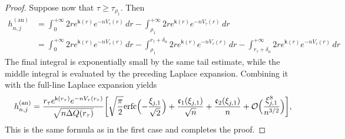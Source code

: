 \documentclass[a4paper]{article}
\numberwithin{equation}{section}
\begin{document}
\begin{proof}
Suppose now that $\tau\geq\tau_{\rho_1}$. Then
\begin{align*}
h_{n,j}^{(\mathrm{an})}
&=
\int_0^{+\infty}
2re^{\mathsf{k}(r)}e^{-nV_{\tau}(r)}\,dr
-\int_{\rho_1}^{+\infty}
2re^{\mathsf{k}(r)}e^{-nV_{\tau}(r)}\,dr
\\
&=
\int_0^{+\infty}
2re^{\mathsf{k}(r)}e^{-nV_{\tau}(r)}\,dr
-\int_{\rho_1}^{r_{\tau}+\delta_n}
2re^{\mathsf{k}(r)}e^{-nV_{\tau}(r)}\,dr
-
\int_{r_{\tau}+\delta_n}^{+\infty}
2re^{\mathsf{k}(r)}e^{-nV_{\tau}(r)}\,dr
\end{align*}
The final integral is exponentially small by the same tail estimate, while the middle integral is evaluated by the preceding Laplace expansion. Combining it with the full-line Laplace expansion yields
\begin{align*}
h_{n,j}^{(\mathrm{an})}
= 
\frac{r_{\tau}e^{\mathsf{k}(r_{\tau})}e^{-nV_{\tau}(r_{\tau})}}{\sqrt{n\Delta Q(r_{\tau})}}
\bigg[
\sqrt{\frac{\pi}{2}}\mathrm{erfc}\Bigl( -\frac{\xi_{j,1}}{\sqrt{2}}\Bigr)
+\frac{\mathfrak{c}_1(\xi_{j,1})}{\sqrt{n}}+\frac{\mathfrak{c}_2(\xi_{j,1})}{n}+\mathcal{O}\Bigl(\frac{\xi_{j,1}^8}{n^{3/2}}\Bigr)
\bigg],
\end{align*}
This is the same formula as in the first case and completes the proof.
\end{proof}
\end{document}
